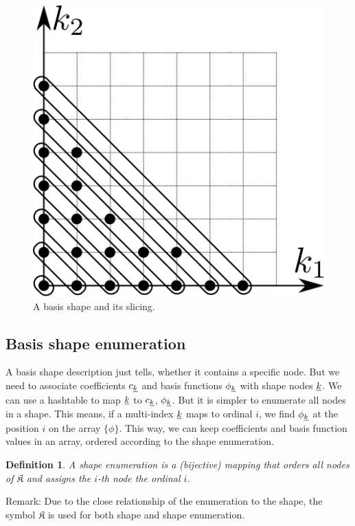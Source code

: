 \documentclass{article}
\newtheorem{definition}{Definition}
\begin{document}
\begin{figure}[H]
  \centering
  \includegraphics[]{shape_slicing}
  \caption{A basis shape and its slicing.}
\end{figure}


\subsection{Basis shape enumeration}
A basis shape description just tells, whether it contains a specific node.
But we need to associate coefficients \(c_{\underline{k}}\)
and basis functions \(\phi_{\underline{k}}\) with shape
nodes \(\underline{k}\). We can use a hashtable to map \(\underline{k}\) to
\(c_{\underline{k}}\), \(\phi_{\underline{k}}\). But it is simpler to
enumerate all nodes in a shape. This means, if a multi-index \(\underline{k}\)
maps to ordinal \(i\), we find \(\phi_{\underline{k}}\) at the position
\(i\) on the array  \(\{\phi\}\).
This way, we can keep coefficients and basis function values in an array,
ordered according to the shape enumeration.

\begin{definition}
  A shape enumeration is a (bijective) mapping that orders all nodes
  of \( \mathfrak{K} \)
  and assigns the \(i\)-th node the ordinal \(i\).
\end{definition}

Remark: Due to the close relationship of the enumeration to the shape,
the symbol \(\mathfrak{K}\) is used for both shape and
shape enumeration.
\end{document}
